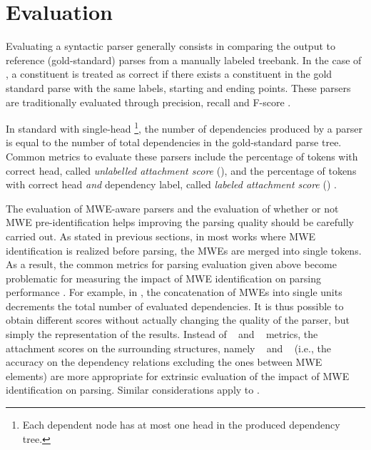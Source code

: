 \documentclass[output=paper]{langsci/langscibook}
\begin{document}
  

%
\section{Evaluation}
\label{con:sec:evaluation}



Evaluating a syntactic parser generally consists in comparing the output to reference  (gold-standard) parses from  a manually labeled treebank.
In the case of , a constituent is treated as correct if there exists a constituent in the gold standard parse with the same labels, starting and ending points. These parsers are traditionally evaluated through precision, recall and F-score \citep{abney1991procedure,sekine1997evalb}. 

In standard  with single-head \footnote{Each dependent node has at most one head in the produced dependency tree.}, the number of dependencies produced by a parser is equal to the number of total dependencies in the gold-standard parse tree. Common metrics to evaluate these parsers include the percentage of tokens with correct head, called \emph{unlabelled attachment score} (\asu), and the percentage of tokens with correct head \emph{and} dependency label, called \emph{labeled attachment score} (\asl) \citep{conllx,nilsson2007conll}. 

The evaluation of MWE-aware parsers and the evaluation of  whether or not MWE pre-identification helps  improving the parsing quality should be carefully carried out.
As stated in previous sections, in most works where MWE identification is realized before parsing, the MWEs are merged into  single tokens.  
As a result, the common metrics for parsing evaluation given above become problematic for measuring the impact of MWE identification on parsing performance \citep{eryigit:2011:multiword}.
For example, in ,
the concatenation of MWEs into single units  decrements the total number of evaluated dependencies. It is thus possible to obtain different scores without actually changing the quality of the parser, but simply the representation of the results. Instead of \asu~ and \asl~ metrics, the attachment scores on the surrounding structures, namely \asus~ and \asls~ (i.e., the accuracy on the dependency relations excluding the ones between MWE elements) are more appropriate for extrinsic evaluation of the impact of MWE identification on parsing. Similar considerations apply to .
\end{document}

